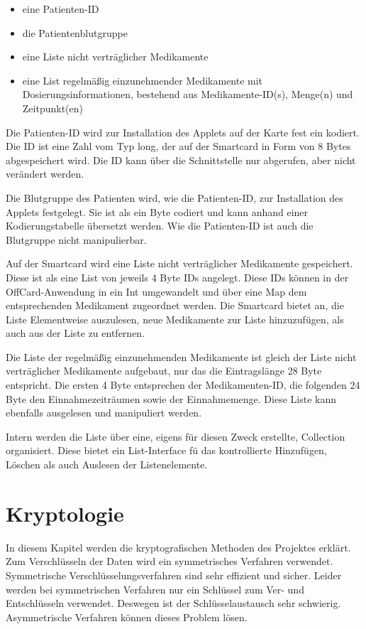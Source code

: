 \documentclass[parskip]{scrartcl}
\begin{document}
	\begin{itemize}
		\item eine Patienten-ID
		\item die Patientenblutgruppe
		\item eine Liste nicht verträglicher Medikamente
		\item eine List regelmäßig einzunehmender Medikamente mit Dosierungsinformationen, bestehend aus Medikamente-ID(s), Menge(n) und Zeitpunkt(en)
	\end{itemize}
	
	Die Patienten-ID wird zur Installation des Applets auf der Karte fest ein kodiert. Die ID ist eine Zahl vom Typ long, der auf der Smartcard in Form von 8 Bytes abgespeichert wird. Die ID kann über die Schnittstelle nur abgerufen, aber nicht verändert werden.
	
	Die Blutgruppe des Patienten wird, wie die Patienten-ID, zur Installation des Applets festgelegt. Sie ist als ein Byte codiert und kann anhand einer Kodierungstabelle übersetzt werden. Wie die Patienten-ID ist auch die Blutgruppe nicht manipulierbar.
	
	Auf der Smartcard wird eine Liste nicht verträglicher Medikamente gespeichert. Diese ist als eine List von jeweils 4 Byte IDs angelegt. Diese IDs können in der OffCard-Anwendung in ein Int umgewandelt und über eine Map dem entsprechenden Medikament zugeordnet werden. Die Smartcard bietet an, die Liste Elementweise auszulesen, neue Medikamente zur Liste hinzuzufügen, als auch aus der Liste zu entfernen.
	
	Die Liste der regelmäßig einzunehmenden Medikamente ist gleich der Liste nicht verträglicher Medikamente aufgebaut, nur das die Eintragslänge 28 Byte entspricht. Die ersten 4 Byte entsprechen der Medikamenten-ID, die folgenden 24 Byte den Einnahmezeiträumen sowie der Einnahmemenge. Diese Liste kann ebenfalls ausgelesen und manipuliert werden.
	
	Intern werden die Liste über eine, eigens für diesen Zweck erstellte, Collection organisiert. Diese bietet ein List-Interface fü das kontrollierte Hinzufügen, Löschen als auch Auslesen der Listenelemente.
\section{Kryptologie}
In diesem Kapitel werden die kryptografischen Methoden des Projektes erklärt. Zum Verschlüsseln der Daten wird ein symmetrisches Verfahren verwendet. Symmetrische Verschlüsselungsverfahren sind sehr effizient und sicher. Leider werden bei symmetrischen Verfahren nur ein Schlüssel zum Ver- und Entschlüsseln verwendet. Deswegen ist der Schlüsselaustausch sehr schwierig. Asymmetrische Verfahren können dieses Problem lösen.
\end{document}
